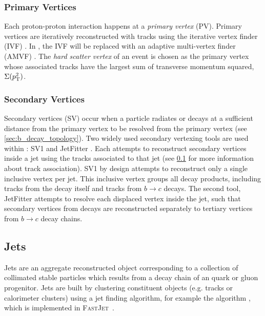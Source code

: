 \subsubsection{Primary Vertices}
Each proton-proton interaction happens at a \textit{primary vertex} (PV).
Primary vertices are iteratively reconstructed with tracks using the iterative vertex finder (IVF) \cite{PERF-2015-01}.
In \runthree, the IVF will be replaced with an adaptive multi-vertex finder (AMVF) \cite{ATL-PHYS-PUB-2019-015}.
The \textit{hard scatter vertex} of an event is chosen as the primary vertex whose associated tracks have the largest sum of transverse momentum squared, $\Sigma(p_{\text{T}}^2)$.

\subsubsection{Secondary Vertices}
Secondary vertices (SV) occur when a particle radiates or decays at a sufficient distance from the primary vertex to be resolved from the primary vertex (see \cref{sec:b_decay_topology}).
Two widely used secondary vertexing tools are used within \ATLAS: SV1 and JetFitter \cite{FTAG-2018-01}.
Each attempts to reconstruct secondary vertices inside a jet using the tracks associated to that jet (see \cref{sec:jet_reco} for more information about track association).
SV1 by design attempts to reconstruct only a single inclusive vertex per jet.
This inclusive vertex groups all \bhadron decay products, including tracks from the \bhadron decay itself and tracks from $b \rightarrow c$ decays.
The second tool, JetFitter attempts to resolve each displaced vertex inside the jet, such that secondary vertices from \bhadron decays are reconstructed separately to tertiary vertices from $b \rightarrow c$ decay chains.


\subsection{Jets}\label{sec:jet_reco}
Jets are an aggregate reconstructed object corresponding to a collection of collimated stable particles which results from a decay chain of an quark or gluon progenitor.
Jets are built by clustering constituent objects (e.g. tracks or calorimeter clusters) using a jet finding algorithm, for example the \antikt algorithm \cite{Cacciari:2008gp}, which is implemented in \textsc{FastJet}~\cite{Cacciari:2012:fastjet}.

